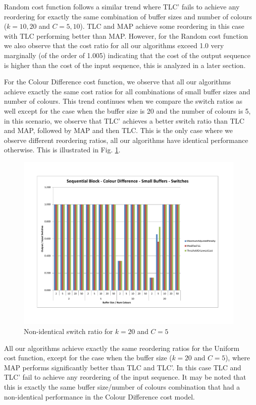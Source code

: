 Random cost function follows a similar trend where TLC' fails to achieve any reordering for exactly the same combination of buffer sizes and number of colours ($k = 10, 20$ and $C = 5, 10$). TLC and MAP achieve some reordering in this case with TLC performing better than MAP. However, for the Random cost function we also observe that the cost ratio for all our algorithms exceed 1.0 very marginally (of the order of 1.005) indicating that the cost of the output sequence is higher than the cost of the input sequence, this is analyzed in a later section. 

For the Colour Difference cost function, we observe that all our algorithms achieve exactly the same cost ratios for all combinations of small buffer sizes and number of colours. This trend continues when we compare the switch ratios as well except for the case when the buffer size is 20 and the number of colours is 5, in this scenario, we observe that TLC' achieves a better switch ratio than TLC and MAP, followed by MAP and then TLC. This is the only case where we observe different reordering ratios, all our algorithms have identical performance otherwise. This is illustrated in Fig. \ref{sequentialBlockCDSmallSwitches}. 

\begin{figure}[ht]
\centering 
\includegraphics[scale=0.60]{Sequential-Block-cd-small-switches.pdf}
\caption{Non-identical switch ratio for $k = 20$ and $C = 5$}
\label{sequentialBlockCDSmallSwitches}
\end{figure}   

All our algorithms achieve exactly the same reordering ratios for the Uniform cost function, except for the case when the buffer size ($k = 20$ and $C = 5$), where MAP performs significantly better than TLC and TLC'. In this case TLC and TLC' fail to achieve any reordering of the input sequence. It may be noted that this is exactly the same buffer size/number of colours combination that had a non-identical performance in the Colour Difference cost model. 


